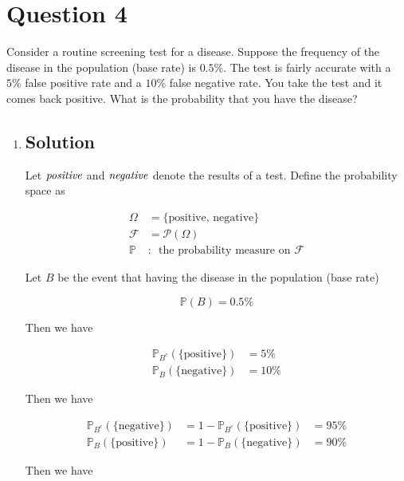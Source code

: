 \documentclass[12pt]{article}
\newcommand{\bP}{\mathbb{P}}
\begin{document}
	
	\section*{Question 4}
	
	\noindent Consider a routine screening test for a disease. Suppose the frequency of the disease in the population (base rate) is $0.5\%$. The test is fairly accurate with a $5\%$ false positive rate and a $10\%$ false negative rate. You take the test and it comes back positive. What is the probability that you have the disease?
	
	\bigskip
	
	\begin{enumerate}[label={},leftmargin=0in]\item
		
		\subsection*{Solution}
		
			Let $\it{positive}$ and $\it{negative}$ denote the results of a test. Define the probability space as
			
			\[
			\begin{aligned}
				\Omega &= \{\mathrm{positive},\,\mathrm{negative}\}\\
				\mathcal{F} &= \mathcal{P}(\Omega)\\
				\bP &:\enspace \text{the probability measure on $\mathcal{F}$}
			\end{aligned}
			\]
			
			Let $B$ be the event that having the disease in the population (base rate)
			
			\[\bP(B) = 0.5\%\]
			
			Then we have
			
			\[
			\begin{aligned}
				\bP_{B^c}(\{\mathrm{positive}\}) &= 5\%\\
				\bP_B(\{\mathrm{negative}\}) &= 10\%
			\end{aligned}
			\]
			
			Then we have
			
			\[
			\begin{aligned}
				\bP_{B^c}(\{\mathrm{negative}\}) &= 1-\bP_{B^c}(\{\mathrm{positive}\}) &= 95\%\\
				\bP_B(\{\mathrm{positive}\}) &= 1-\bP_B(\{\mathrm{negative}\}) &= 90\%
			\end{aligned}
			\]
			
			Then we have
			

\end{enumerate}
\end{document}
